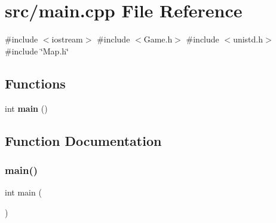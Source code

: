 \section{src/main.cpp File Reference}
\label{main_8cpp}
{\ttfamily \#include $<$iostream$>$}\newline
{\ttfamily \#include $<$Game.\+h$>$}\newline
{\ttfamily \#include $<$unistd.\+h$>$}\newline
{\ttfamily \#include \char`\"{}Map.\+h\char`\"{}}\newline
\subsection*{Functions}
\begin{DoxyCompactItemize}
\item 
int \textbf{ main} ()
\end{DoxyCompactItemize}


\subsection{Function Documentation}
\mbox{\label{main_8cpp_ae66f6b31b5ad750f1fe042a706a4e3d4}} 
\subsubsection{main()}
{\footnotesize\ttfamily int main (\begin{DoxyParamCaption}{ }\end{DoxyParamCaption})}

